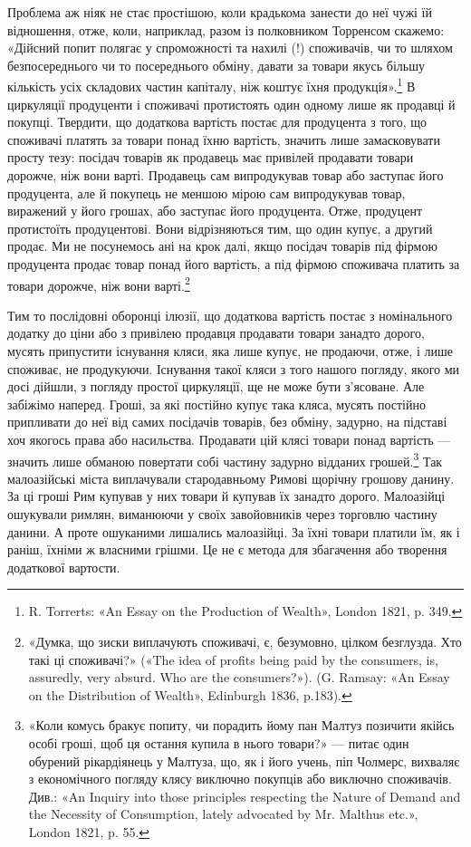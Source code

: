 Проблема аж ніяк не стає простішою, коли крадькома занести
до неї чужі їй відношення, отже, коли, наприклад, разом із полковником
Торренсом скажемо: «Дійсний попит полягає у спроможності
та нахилі (!) споживачів, чи то шляхом безпосереднього
чи то посереднього обміну, давати за товари якусь більшу
кількість усіх складових частин капіталу, ніж коштує їхня продукція».\footnote{
R. Torrerts: «An Essay on the Production of Wealth», London
1821, p. 349.
}
В циркуляції продуценти і споживачі протистоять
один одному лише як продавці й покупці. Твердити, що додаткова
вартість постає для продуцента з того, що споживачі платять
за товари понад їхню вартість, значить лише замасковувати
просту тезу: посідач товарів як продавець має привілей продавати
товари дорожче, ніж вони варті. Продавець сам випродукував
товар або заступає його продуцента, але й покупець не меншою
мірою сам випродукував товар, виражений у його грошах,
або заступає його продуцента. Отже, продуцент протистоїть
продуцентові. Вони відрізняються тим, що один купує, а другий
продає. Ми не посунемось ані на крок далі, якщо посідач товарів
під фірмою продуцента продає товар понад його вартість, а під
фірмою споживача платить за товари дорожче, ніж вони варті.\footnote{
«Думка, що зиски виплачують споживачі, є, безумовно, цілком
безглузда. Хто такі ці споживачі?» («The idea of profits being paid by
the consumers, is, assuredly, very absurd. Who are the consumers?»).
(G. Ramsay: «An Essay on the Distribution of Wealth», Edinburgh 1836, p.183).
}

Тим то послідовні оборонці ілюзії, що додаткова вартість
постає з номінального додатку до ціни або з привілею продавця
продавати товари занадто дорого, мусять припустити існування
кляси, яка лише купує, не продаючи, отже, і лише споживає,
не продукуючи. Існування такої кляси з того нашого погляду,
якого ми досі дійшли, з погляду простої циркуляції, ще не може
бути з’ясоване. Але забіжімо наперед. Гроші, за які постійно
купує така кляса, мусять постійно припливати до неї від самих
посідачів товарів, без обміну, задурно, на підставі хоч якогось
права або насильства. Продавати цій клясі товари понад вартість
— значить лише обманою повертати собі частину задурно
відданих грошей.\footnote{
«Коли комусь бракує попиту, чи порадить йому пан Малтуз позичити
якійсь особі гроші, щоб ця остання купила в нього товари?» — питає
один обурений рікардіянець у Малтуза, що, як і його учень, піп Чолмерс,
вихваляє з економічного погляду клясу виключно покупців або виключно
споживачів. Див.: «An Inquiry into those principles respecting the Nature
of Demand and the Necessity of Consumption, lately advocated by Mr. Malthus
etc.», London 1821, p. 55.
} Так малоазійські міста виплачували стародавньому
Римові щорічну грошову данину. За ці гроші Рим купував
у них товари й купував їх занадто дорого. Малоазійці ошукували
римлян, виманюючи у своїх завойовників через торговлю
частину данини. А проте ошуканими лишались малоазійці. За
їхні товари платили їм, як і раніш, їхніми ж власними грішми.
Це не є метода для збагачення або творення додаткової вартости.

